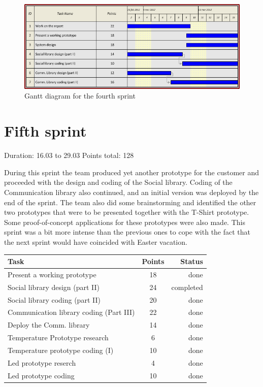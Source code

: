 \begin{figure}[h!]
\centering \includegraphics[scale=0.8]{img/sprints-gantt4.png}
\caption{Gantt diagram for the fourth sprint}
\label{fig:sprints-gantt4}
\end{figure}

\newpage

\section{Fifth sprint}

Duration: 16.03 to 29.03
Points total: 128

During this sprint the team produced yet another prototype for the customer
and proceeded with the design and coding of the Social library.
Coding of the Communication library also continued, and an initial version
was deployed by the end of the sprint. The team also did some brainstorming
and identified the other two prototypes that were to be presented together with
the T-Shirt prototype. Some proof-of-concept applications for these
prototypes were also made. This sprint was a bit more intense than the previous
ones to cope with the fact that the next sprint would have coincided with Easter vacation.

\begin{table}[ht!]
\begin{tabular}{ | l | c | r | }

\hline
\textbf{Task} & \textbf{Points} & \textbf{Status} \\
\hline

Present a working prototype				& 18 & done \\
\hline
Social library design (part II)			& 24 & completed \\
\hline
Social library coding (part II)			& 20 & done \\
\hline
Communication library coding (Part III)	& 22 & done \\
\hline
Deploy the Comm. library				& 14 & done \\
\hline
Temperature Prototype research			& 6  & done \\
\hline
Temperature prototype coding (I)		& 10 & done \\
\hline
Led prototype reserch					& 4  & done \\
\hline
Led prototype coding					& 10 & done \\
\hline

\end{tabular}
\end{table}


